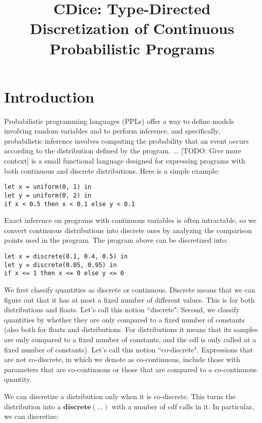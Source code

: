 \documentclass[nonacm,anonymous]{acmart}
\title{CDice: Type-Directed Discretization of Continuous Probabilistic Programs}
\newcommand{\CDice}{\text{\scshape CDice}\xspace}
\begin{document}
\maketitle


\section{Introduction}
Probabilistic programming languages (PPLs) offer a way to define models involving random variables and to perform inference, and specifically, probabilistic inference involves computing the probability that an event occurs according to the distribution defined by the program. ... [TODO: Give more context] \CDice is a small functional language designed for expressing programs with both continuous and discrete distributions. Here is a simple example:

\begin{lstlisting}
let x = uniform(0, 1) in
let y = uniform(0, 2) in
if x < 0.5 then x < 0.1 else y < 0.1
\end{lstlisting}


Exact inference on programs with continuous variables is often intractable, so we convert continuous distributions into discrete ones by analyzing the comparison points used in the program. The program above can be discretized into:

\begin{lstlisting}
let x = discrete(0.1, 0.4, 0.5) in
let y = discrete(0.05, 0.95) in
if x <= 1 then x <= 0 else y <= 0
\end{lstlisting}


We first classify quantities as discrete or continuous. Discrete means that we can figure out that it has at most a fixed number of different values. This is for both distributions and floats. Let's call this notion ``discrete". Second, we classify quantities by whether they are only compared to a fixed number of constants (also both for floats and distributions. For distributions it means that its samples are only compared to a fixed number of constants, and the cdf is only called at a fixed number of constants). Let's call this notion ``co-discrete". Expressions that are not co-discrete, in which we denote as co-continuous, include those with parameters that are co-continuous or those that are compared to a co-continuous quantity.

We can discretize a distribution only when it is co-discrete. This turns the distribution into a $\mathbf{discrete(...)}$ with a number of cdf calls in it. In particular, we can discretize:
\end{document}
